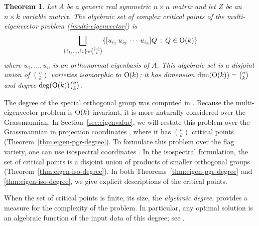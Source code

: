 \documentclass[12pt]{extarticle}
\newtheorem{theorem}{Theorem}
\theoremstyle{definition}
\numberwithin{theorem}{section}
\begin{document}
\begin{theorem}\label{thm:eigen}
  Let $A$ be a generic real symmetric $n \times n$ matrix and let $Z$ be an $n \times k$ variable matrix. 
  The algebraic set of complex critical points of the multi-eigenvector problem (\ref{multi-eigenvector}) is
  $$ \bigsqcup_{\{i_1, \ldots, i_k\} \in \binom{[n]}{k}} \{[u_{i_1} \, u_{i_2} \, \cdots \, u_{i_k}] Q \, : \, Q \in {\rm O}(k)\} $$ 
  where $u_1, \ldots, u_n$ is an orthonormal eigenbasis of $A$. This algebraic set is a disjoint union of $\binom{n}{k}$ varieties isomorphic to ${\rm O}(k)$; it has dimension $\dim({\rm O}(k)) = \binom{n}{k}$
  and degree $\deg({\rm O}(k)) \binom{n}{k}$.
\end{theorem}
The degree of the special orthogonal group was computed in \cite[Theorem 1.1]{BBBKR}.
Because the multi-eigenvector problem  is ${\rm O}(k)$-invariant, it is more naturally considered over the Grassmannian. 
In Section~\ref{sec:eigenvalue}, we will restate this problem over the Grassmannian in projection coordinates \cite{DFRS}, where it has $\binom{n}{k}$ critical points (Theorem~\ref{thm:eigen-pgr-degree}).
To formulate this problem over the flag variety, one can use isospectral coordinates \cite{LY24b}. 
In the isospectral formulation, the set of critical points is a disjoint union of products of smaller orthogonal groups (Theorem~\ref{thm:eigen-iso-degree}).
In both Theorems~\ref{thm:eigen-pgr-degree} and \ref{thm:eigen-iso-degree}, we give explicit descriptions of the critical points.

When the set of critical points is finite, its size, the {\em algebraic degree}, provides a measure for the complexity of the problem. In particular, any optimal solution is an algebraic function of the input data of this degree; see \cite{JR09, JRS10,R12}.
\end{document}
